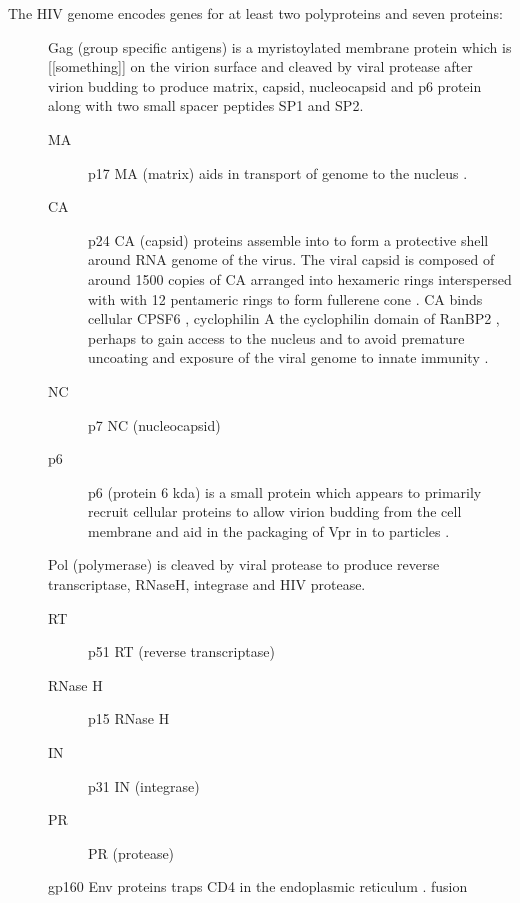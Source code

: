 \documentclass[../sherrill-Mix_thesis.tex]{subfiles}
\begin{document}
The HIV genome encodes genes for at least two polyproteins and seven proteins:\\ %
\begin{description}
	\item[\gag{}]
		Gag (group specific antigens) is a myristoylated membrane protein which is [[something]] on the virion surface and cleaved by viral protease after virion budding to produce matrix, capsid, nucleocapsid and p6 protein along with two small spacer peptides SP1 and SP2. 
		\begin{description}
			\item[MA]
				p17 MA (matrix) aids in transport of genome to the nucleus \citep{Heinzinger1994}.
			\item[CA]
					p24 CA (capsid) proteins assemble into to form a protective shell around RNA genome of the virus. The viral capsid is composed of around 1500 copies of CA arranged into hexameric rings interspersed with with 12 pentameric rings to form fullerene cone \citep{Ganser1999,Li2000,Byeon2009,Zhao2013}. CA binds cellular CPSF6 \citep{Lee2010}, cyclophilin A \citep{Thali1994,Gamble2007} the cyclophilin domain of RanBP2 \citep{Schaller2011}, perhaps to gain access to the nucleus \citep{Schaller2011} and to avoid premature uncoating and exposure of the viral genome to innate immunity \citep{Rasaiyaah2013}.
			\item[NC]
				p7 NC (nucleocapsid)
			\item[p6]
				p6 (protein 6 kda) is a small protein which appears to primarily recruit cellular proteins to allow virion budding from the cell membrane \citep{Veronese1987,Goettlinger1991,Strack2003} and aid in the packaging of Vpr in to particles \citep{Paxton1993}.
		\end{description}
	\item[\pol{}]
		Pol (polymerase) is cleaved by viral protease to produce reverse transcriptase, RNaseH, integrase and HIV protease. 
		\begin{description}
			\item[RT]
				p51 RT (reverse transcriptase)
			\item[RNase H]
				p15 RNase H
			\item[IN]
				p31 IN (integrase)
			\item[PR]
				PR (protease)
		\end{description}
	\item[\env{}]
		gp160 Env proteins traps CD4 in the endoplasmic reticulum \citep{Crise1990,Bour1991}. fusion \citep{Lifson1986}

\end{description}
\end{document}
